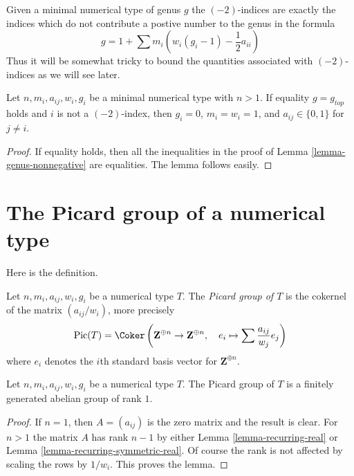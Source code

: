 \noindent
Given a minimal numerical type of genus $g$ the $(-2)$-indices
are exactly the indices which do not contribute a postive number
to the genus in the formula
$$
g = 1 + \sum m_i(w_i(g_i - 1) - \frac{1}{2} a_{ii})
$$
Thus it will be somewhat tricky to bound the quantities associated
with $(-2)$-indices as we will see later.

\begin{lemma}
\label{lemma-genus-equality}
Let $n, m_i, a_{ij}, w_i, g_i$ be a minimal numerical type with $n > 1$.
If equality $g = g_{top}$ holds and $i$ is not a $(-2)$-index, then
$g_i = 0$, $m_i = w_i = 1$, and $a_{ij} \in \{0, 1\}$ for $j \not = i$.
\end{lemma}

\begin{proof}
If equality holds, then all the inequalities in the
proof of Lemma \ref{lemma-genus-nonnegative} are equalities.
The lemma follows easily.
\end{proof}


\section{The Picard group of a numerical type}
\label{section-picard-group}

\noindent
Here is the definition.

\begin{definition}
\label{definition-picard-group}
Let $n, m_i, a_{ij}, w_i, g_i$ be a numerical type $T$. The
{\it Picard group of $T$} is the cokernel of the matrix
$(a_{ij}/w_i)$, more precisely
$$
\text{Pic}(T) =
\Coker\left(
\mathbf{Z}^{\oplus n} \to \mathbf{Z}^{\oplus n},\quad
e_i
\mapsto
\sum \frac{a_{ij}}{w_j}e_j
\right)
$$
where $e_i$ denotes the $i$th standard basis vector for $\mathbf{Z}^{\oplus n}$.
\end{definition}

\begin{lemma}
\label{lemma-picard-rank-1}
Let $n, m_i, a_{ij}, w_i, g_i$ be a numerical type $T$.
The Picard group of $T$ is a finitely generated abelian group of rank $1$.
\end{lemma}

\begin{proof}
If $n = 1$, then $A = (a_{ij})$ is the zero matrix and
the result is clear. For $n > 1$ the matrix $A$ has rank
$n - 1$ by either Lemma \ref{lemma-recurring-real} or
Lemma \ref{lemma-recurring-symmetric-real}.
Of course the rank is not affected by scaling the rows
by $1/w_i$. This proves the lemma.
\end{proof}

